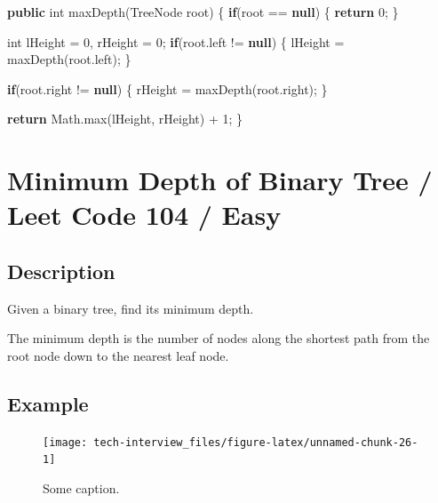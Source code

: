 \documentclass[]{book}
\newenvironment{Shaded}{\begin{snugshade}}{\end{snugshade}}
\newcommand{\BuiltInTok}[1]{#1}
\newcommand{\DataTypeTok}[1]{\textcolor[rgb]{0.13,0.29,0.53}{#1}}
\newcommand{\DecValTok}[1]{\textcolor[rgb]{0.00,0.00,0.81}{#1}}
\newcommand{\FunctionTok}[1]{\textcolor[rgb]{0.00,0.00,0.00}{#1}}
\newcommand{\KeywordTok}[1]{\textcolor[rgb]{0.13,0.29,0.53}{\textbf{#1}}}
\newcommand{\NormalTok}[1]{#1}
\begin{document}
\begin{Shaded}
\begin{Highlighting}[]
\KeywordTok{public} \DataTypeTok{int} \FunctionTok{maxDepth}\NormalTok{(}\BuiltInTok{TreeNode}\NormalTok{ root) \{}
    \KeywordTok{if}\NormalTok{(root == }\KeywordTok{null}\NormalTok{) \{}
        \KeywordTok{return} \DecValTok{0}\NormalTok{;}
\NormalTok{    \}}

    \DataTypeTok{int}\NormalTok{ lHeight = }\DecValTok{0}\NormalTok{, rHeight = }\DecValTok{0}\NormalTok{;}
    \KeywordTok{if}\NormalTok{(root.}\FunctionTok{left}\NormalTok{ != }\KeywordTok{null}\NormalTok{) \{}
\NormalTok{        lHeight = }\FunctionTok{maxDepth}\NormalTok{(root.}\FunctionTok{left}\NormalTok{);}
\NormalTok{    \}}

    \KeywordTok{if}\NormalTok{(root.}\FunctionTok{right}\NormalTok{ != }\KeywordTok{null}\NormalTok{) \{}
\NormalTok{        rHeight = }\FunctionTok{maxDepth}\NormalTok{(root.}\FunctionTok{right}\NormalTok{);}
\NormalTok{    \}}

    \KeywordTok{return} \BuiltInTok{Math}\NormalTok{.}\FunctionTok{max}\NormalTok{(lHeight, rHeight) + }\DecValTok{1}\NormalTok{;}
\NormalTok{\}}
\end{Highlighting}
\end{Shaded}

\hypertarget{minimum-depth-of-binary-tree-leet-code-104-easy}{%
\section{Minimum Depth of Binary Tree / Leet Code 104 / Easy}\label{minimum-depth-of-binary-tree-leet-code-104-easy}}

\hypertarget{description-66}{%
\subsection{Description}\label{description-66}}

Given a binary tree, find its minimum depth.

The minimum depth is the number of nodes along the shortest path from the root node down to the nearest leaf
node.

\hypertarget{example-63}{%
\subsection{Example}\label{example-63}}

\begin{figure}
\texttt{[image: tech-interview\_files/figure-latex/unnamed-chunk-26-1]} \caption{Some caption.}\label{fig:unnamed-chunk-26}
\end{figure}
\end{document}
